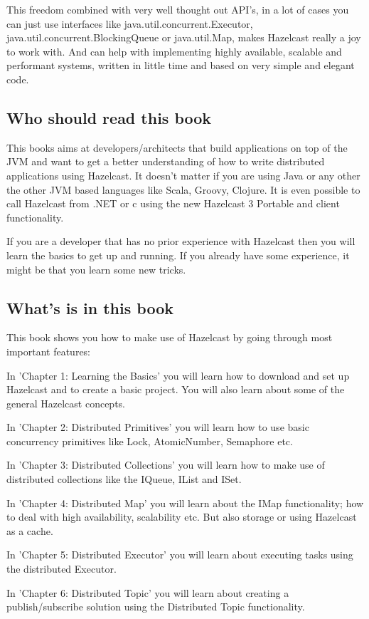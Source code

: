 This freedom combined with very well thought out API's, in a lot of cases you can just use interfaces like java.util.concurrent.Executor, java.util.concurrent.BlockingQueue or java.util.Map, makes Hazelcast really a joy to work with. And can help with implementing highly available, scalable and performant systems, written in little time and based on very simple and elegant code.

\subsection*{Who should read this book}
This books aims at developers/architects that build applications on top of the JVM and want to get a better understanding of how to write distributed applications using Hazelcast. It doesn't matter if you are using Java or any other the other JVM based languages like Scala, Groovy, Clojure. It is even possible to call Hazelcast from .NET or c using the new Hazelcast 3 Portable and client functionality.

If you are a developer that has no prior experience with Hazelcast then you will learn the basics to get up and running. If you already have some experience, it might be that you learn some new tricks.
 
\subsection*{What's is in this book}
This book shows you how to make use of Hazelcast by going through most important features:

In 'Chapter 1: Learning the Basics' you will learn how to download and set up Hazelcast and to create a basic project. You will also learn about some of the general Hazelcast concepts.

In 'Chapter 2: Distributed Primitives' you will learn how to use basic concurrency primitives like Lock, AtomicNumber, Semaphore etc.

In 'Chapter 3: Distributed Collections' you will learn how to make use of distributed collections like the IQueue, IList and ISet.

In 'Chapter 4: Distributed Map' you will learn about the IMap functionality; how to deal with high availability, scalability etc. But also storage or using Hazelcast as a cache.

In 'Chapter 5: Distributed Executor' you will learn about executing tasks using the distributed Executor. 

In 'Chapter 6: Distributed Topic' you will learn about creating a publish/subscribe solution using the Distributed Topic functionality.

